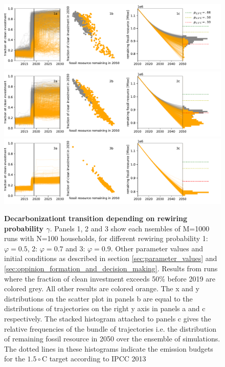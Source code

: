\begin{figure}[H]
	\centering
        \includegraphics[width = 1.2 \textwidth]{figures/fitted_initials_evaluation05.pdf}
        \includegraphics[width = 1.2 \textwidth]{figures/fitted_initials_evaluation07.pdf}
        \includegraphics[width = 1.2 \textwidth]{figures/fitted_initials_evaluation09.pdf}
        \caption{\textbf{Decarbonizationt transition depending on rewiring probability $\gamma$}. Panels 1, 2 and 3 show each nsembles of M=1000 runs with N=100 households, for different rewiring probability 1: $\varphi=0.5$, 2: $\varphi=0.7$ and 3: $\varphi=0.9$. Other parameter values and initial conditions as described in section \ref{sec:parameter_values} and \ref{sec:oppinion_formation_and_decision_making}. Results from runs where the fraction of clean investment exceeds 50\% before 2019 are colored grey. All other results are colored orange. The x and y distributions on the scatter plot in panels b are equal to the distributions of trajectories on the right y axis in panels a and c respectively. The stacked histogram attached to panels c gives the relative frequencies of the bundle of trajectories i.e. the distribution of remaining fossil resource in 2050 over the ensemble of simulations. The dotted lines in these histograms indicate the emission budgets for the $1.5\circ$C target according to IPCC 2013}
        \label{fig:default_alpha_05}
\end{figure}


